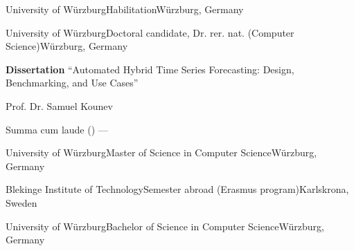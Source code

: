 
\begin{cventries}

	{University of Würzburg}{Habilitation}{Würzburg, Germany}%
	{}%
	{}

	{University of Würzburg}{Doctoral candidate, Dr. rer. nat. (Computer Science)}{Würzburg, Germany}%
	{}%
	{
		\begin{cvitems} %
			\item {\textbf{Dissertation} ``Automated Hybrid Time Series Forecasting: Design, Benchmarking, and Use Cases''}
			\item {\textbf{} Prof. Dr. Samuel Kounev}
			\item {\textbf{} Summa cum laude () --- }
		\end{cvitems}
	}

	{University of Würzburg}{Master of Science in Computer Science}{Würzburg, Germany}%
	{}%
    {
	}

	{Blekinge Institute of Technology}{Semester abroad (Erasmus program)}{Karlskrona, Sweden}%
    {}%
    {}

	{University of Würzburg}{Bachelor of Science in Computer Science}{Würzburg, Germany}%
    {}%
    {
	}



\end{cventries}
